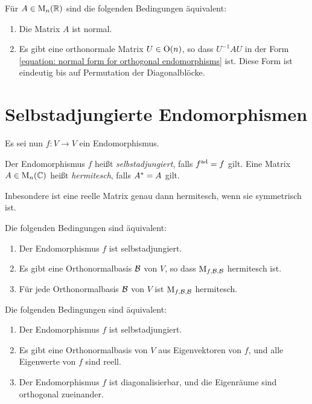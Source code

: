 \begin{corollary}
  Für $A \in \operatorname{M}_{n}(\mathbb{R})$ sind die folgenden Bedingungen äquivalent:
  \begin{enumerate}
    \item
      Die Matrix $A$ ist normal.
    \item
      Es gibt eine orthonormale Matrix $U \in \operatorname{O}(n)$, so dass $U^{-1} A U$ in der Form \eqref{equation: normal form for orthogonal endomorphisms} ist.
      Diese Form ist eindeutig bis auf Permutation der Diagonalblöcke.
  \end{enumerate}
\end{corollary}





\section{Selbstadjungierte Endomorphismen}

Es sei nun $f \colon V \to V$ ein Endomorphismus.

\begin{definition}
  Der Endomorphismus $f$ heißt \emph{selbstadjungiert}, falls $f^{\operatorname{ad}} = f$ gilt.
  Eine Matrix $A \in \operatorname{M}_{n}(\mathbb{C})$ heißt \emph{hermitesch}, falls $A^* = A$ gilt.
\end{definition}

Inbesondere ist eine reelle Matrix genau dann hermitesch, wenn sie symmetrisch ist.

\begin{lemma}
  Die folgenden Bedingungen sind äquivalent:
  \begin{enumerate}
    \item
      Der Endomorphismus $f$ ist selbstadjungiert.
    \item
      Es gibt eine Orthonormalbasis $\mathcal{B}$ von $V$, so dass $\operatorname{M}_{f, \mathcal{B}, \mathcal{B}}$ hermitesch ist.
    \item
      Für jede Orthonormalbasis $\mathcal{B}$ von $V$ ist $\operatorname{M}_{f, \mathcal{B}, \mathcal{B}}$ hermitesch.
  \end{enumerate}
\end{lemma}

\begin{theorem}
  Die folgenden Bedingungen sind äquivalent:
  \begin{enumerate}
    \item
      Der Endomorphismus $f$ ist selbstadjungiert.
    \item
      Es gibt eine Orthonormalbasis von $V$ aus Eigenvektoren von $f$, und alle Eigenwerte von $f$ sind reell.
    \item
      Der Endomorphismus $f$ ist diagonalisierbar, und die Eigenräume sind orthogonal zueinander.
  \end{enumerate}
\end{theorem}

